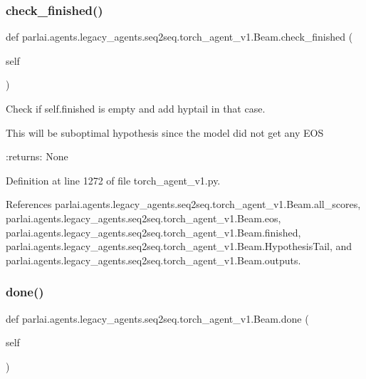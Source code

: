\subsubsection{\texorpdfstring{check\+\_\+finished()}{check\_finished()}}
{\footnotesize\ttfamily def parlai.\+agents.\+legacy\+\_\+agents.\+seq2seq.\+torch\+\_\+agent\+\_\+v1.\+Beam.\+check\+\_\+finished (\begin{DoxyParamCaption}\item[{}]{self }\end{DoxyParamCaption})}

\begin{DoxyVerb}Check if self.finished is empty and add hyptail in that case.

This will be suboptimal hypothesis since the model did not get any EOS

:returns: None
\end{DoxyVerb}
 

Definition at line 1272 of file torch\+\_\+agent\+\_\+v1.\+py.



References parlai.\+agents.\+legacy\+\_\+agents.\+seq2seq.\+torch\+\_\+agent\+\_\+v1.\+Beam.\+all\+\_\+scores, parlai.\+agents.\+legacy\+\_\+agents.\+seq2seq.\+torch\+\_\+agent\+\_\+v1.\+Beam.\+eos, parlai.\+agents.\+legacy\+\_\+agents.\+seq2seq.\+torch\+\_\+agent\+\_\+v1.\+Beam.\+finished, parlai.\+agents.\+legacy\+\_\+agents.\+seq2seq.\+torch\+\_\+agent\+\_\+v1.\+Beam.\+Hypothesis\+Tail, and parlai.\+agents.\+legacy\+\_\+agents.\+seq2seq.\+torch\+\_\+agent\+\_\+v1.\+Beam.\+outputs.

\mbox{\label{classparlai_1_1agents_1_1legacy__agents_1_1seq2seq_1_1torch__agent__v1_1_1Beam_a8b62a64897663062c4e3cf9cf85fce50}} 
\subsubsection{\texorpdfstring{done()}{done()}}
{\footnotesize\ttfamily def parlai.\+agents.\+legacy\+\_\+agents.\+seq2seq.\+torch\+\_\+agent\+\_\+v1.\+Beam.\+done (\begin{DoxyParamCaption}\item[{}]{self }\end{DoxyParamCaption})}

